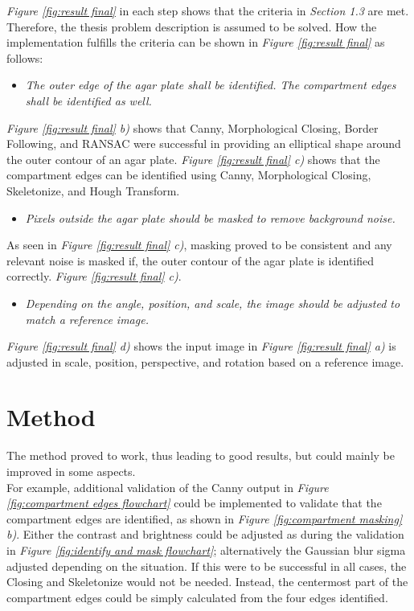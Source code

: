 \noindent \textit{Figure \ref{fig:result final}} in each step shows that the criteria in \textit{Section 1.3} are met. Therefore, the thesis problem description is assumed to be solved. How the implementation fulfills the criteria can be shown in \textit{Figure \ref{fig:result final}} as follows: 
 \begin{itemize}
     \item \textit{The outer edge of the agar plate shall be identified. The compartment edges shall be identified as well.}
 \end{itemize}
\textit{Figure \ref{fig:result final} b)} shows that Canny, Morphological Closing, Border Following, and RANSAC were successful in providing an elliptical shape around the outer contour of an agar plate. \textit{Figure \ref{fig:result final} c)} shows that the compartment edges can be identified using Canny, Morphological Closing, Skeletonize, and Hough Transform. 
  \begin{itemize}
     \item \textit{Pixels outside the agar plate should be masked to remove background noise.}
 \end{itemize}
 As seen in \textit{Figure \ref{fig:result final} c)}, masking proved to be consistent and any relevant noise is masked if, the outer contour of the agar plate is identified correctly.
 \textit{Figure \ref{fig:result final} c)}. 
  \begin{itemize}
     \item \textit{Depending on the angle, position, and scale, the image should be adjusted to match a reference image.}
 \end{itemize}
 \textit{Figure \ref{fig:result final} d)} shows the input image in \textit{Figure \ref{fig:result final} a)} is adjusted in scale, position, perspective, and rotation based on a reference image.


\section{Method}
\label{sec:discussion-method}

The method proved to work, thus leading to good results, but could mainly be improved in some aspects. \\

\noindent For example, additional validation of the Canny output in \textit{Figure \ref{fig:compartment edges flowchart}} could be implemented to validate that the compartment edges are identified, as shown in \textit{Figure \ref{fig:compartment masking} b)}. Either the contrast and brightness could be adjusted as during the validation in \textit{Figure \ref{fig:identify and mask flowchart}}; alternatively the Gaussian blur sigma adjusted depending on the situation. If this were to be successful in all cases, the Closing and Skeletonize would not be needed. Instead, the centermost part of the compartment edges could be simply calculated from the four edges identified. \\


